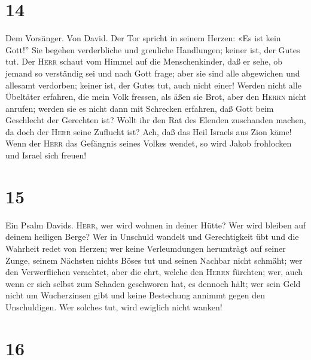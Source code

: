\hypertarget{section-13}{%
\section{14}\label{section-13}}

 Dem Vorsänger. Von David. Der Tor spricht in seinem
Herzen: «Es ist kein Gott!'' Sie begehen verderbliche und greuliche
Handlungen; keiner ist, der Gutes tut.  Der \textsc{Herr}
schaut vom Himmel auf die Menschenkinder, daß er sehe, ob jemand so
verständig sei und nach Gott frage;  aber sie sind alle
abgewichen und allesamt verdorben; keiner ist, der Gutes tut, auch nicht
einer!  Werden nicht alle Übeltäter erfahren, die mein
Volk fressen, als äßen sie Brot, aber den \textsc{Herrn} nicht anrufen;
 werden sie es nicht dann mit Schrecken erfahren, daß Gott
beim Geschlecht der Gerechten ist?  Wollt ihr den Rat des
Elenden zuschanden machen, da doch der \textsc{Herr} seine Zuflucht ist?
 Ach, daß das Heil Israels aus Zion käme! Wenn der
\textsc{Herr} das Gefängnis seines Volkes wendet, so wird Jakob
frohlocken und Israel sich freuen!

\hypertarget{section-14}{%
\section{15}\label{section-14}}

 Ein Psalm Davids. \textsc{Herr}, wer wird wohnen in
deiner Hütte? Wer wird bleiben auf deinem heiligen Berge? 
Wer in Unschuld wandelt und Gerechtigkeit übt und die Wahrheit redet von
Herzen;  wer keine Verleumdungen herumträgt auf seiner
Zunge, seinem Nächsten nichts Böses tut und seinen Nachbar nicht
schmäht;  wer den Verwerflichen verachtet, aber die ehrt,
welche den \textsc{Herrn} fürchten; wer, auch wenn er sich selbst zum
Schaden geschworen hat, es dennoch hält;  wer sein Geld
nicht um Wucherzinsen gibt und keine Bestechung annimmt gegen den
Unschuldigen. Wer solches tut, wird ewiglich nicht wanken!

\hypertarget{section-15}{%
\section{16}\label{section-15}}

